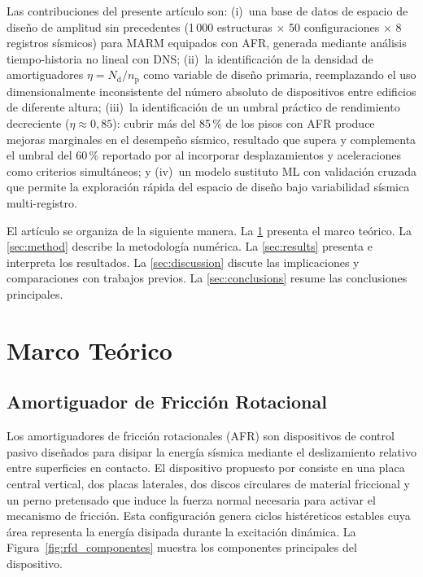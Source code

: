 \documentclass[preprint,12pt,authoryear]{elsarticle}
\newcommand{\nd}{N_{\mathrm{d}}}
\newcommand{\np}{n_{\mathrm{p}}}              %
\newcommand{\etad}{\eta}
\begin{document}
Las contribuciones del presente artículo son: (i)~una base de datos de espacio
de diseño de amplitud sin precedentes (1\,000 estructuras $\times$ 50
configuraciones $\times$ 8 registros sísmicos) para MARM equipados con AFR,
generada mediante análisis tiempo-historia no lineal con DNS; (ii)~la
identificación de la densidad de amortiguadores $\etad = \nd/\np$ como variable
de diseño primaria, reemplazando el uso dimensionalmente inconsistente del número
absoluto de dispositivos entre edificios de diferente altura; (iii)~la identificación de un umbral práctico de rendimiento decreciente
($\etad \approx 0{,}85$): cubrir más del 85\,\% de los pisos con AFR produce
mejoras marginales en el desempeño sísmico, resultado que supera y complementa
el umbral del 60\,\% reportado por \citet{Jarrahi2020sdee} al incorporar
desplazamientos y aceleraciones como criterios simultáneos; y
(iv)~un modelo sustituto ML con validación cruzada que permite la exploración
rápida del espacio de diseño bajo variabilidad sísmica multi-registro.

El artículo se organiza de la siguiente manera. La \cref{sec:theory} presenta el
marco teórico. La \cref{sec:method} describe la metodología numérica. La
\cref{sec:results} presenta e interpreta los resultados. La \cref{sec:discussion}
discute las implicaciones y comparaciones con trabajos previos. La
\cref{sec:conclusions} resume las conclusiones principales.

\section{Marco Teórico}
\label{sec:theory}

\subsection{Amortiguador de Fricción Rotacional}
\label{sec:theory:afr}

Los amortiguadores de fricción rotacionales (AFR) son dispositivos de control
pasivo diseñados para disipar la energía sísmica mediante el deslizamiento
relativo entre superficies en contacto. El dispositivo propuesto por
\citet{Mualla2002} consiste en una placa central vertical, dos placas laterales,
dos discos circulares de material friccional y un perno pretensado que induce la
fuerza normal necesaria para activar el mecanismo de fricción. Esta configuración
genera ciclos histéreticos estables cuya área representa la energía disipada
durante la excitación dinámica. La Figura~\ref{fig:rfd_componentes} muestra
los componentes principales del dispositivo.
\end{document}
